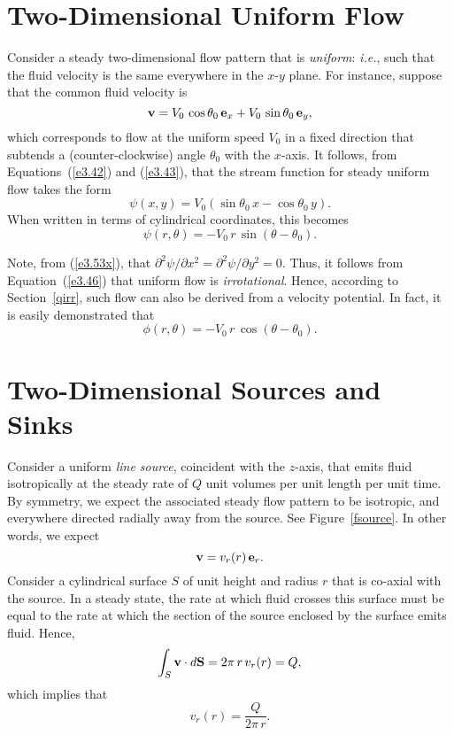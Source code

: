 \section{Two-Dimensional Uniform Flow}\label{suniform}
Consider a steady two-dimensional flow pattern that is {\em uniform}: {\em i.e.}, such that the fluid velocity
is the same everywhere in the $x$-$y$ plane. For instance, suppose that the common fluid velocity is
\begin{equation}
{\bf v} = V_0\,\cos\theta_0\,{\bf e}_x + V_0\,\sin\theta_0\,{\bf e}_y,
\end{equation}
which corresponds to flow at the uniform speed $V_0$ in a fixed direction that subtends a (counter-clockwise) angle
$\theta_0$ with the $x$-axis.  It follows, from Equations~(\ref{e3.42}) and (\ref{e3.43}), that the
stream function for steady uniform flow takes the form
\begin{equation}\label{e3.53x}
\psi(x,y) = V_0\left(\sin\theta_0\,x-\cos\theta_0\,y\right).
\end{equation}
When written in terms of cylindrical coordinates, this becomes
\begin{equation}
\psi(r,\theta)=-V_0\,r\,\sin(\theta-\theta_0).
\end{equation}

Note, from (\ref{e3.53x}), that $\partial^2\psi/\partial x^2=\partial^2\psi/\partial y^2=0$. Thus, it
follows from Equation~(\ref{e3.46}) that uniform flow is {\em irrotational}. Hence, according to
Section~\ref{qirr}, such flow can also be derived from a velocity potential. In fact, it is easily
demonstrated that
\begin{equation}
\phi(r,\theta)  = -V_0\,r\,\cos(\theta-\theta_0).
\end{equation}

\section{Two-Dimensional Sources and Sinks}\label{ssource}
Consider a uniform {\em line source}, coincident with the $z$-axis,
that emits fluid isotropically at the steady rate of $Q$ unit volumes per unit length per unit time. 
By symmetry, we expect the associated steady flow pattern to be isotropic, and everywhere directed radially away from the source.
See Figure~\ref{fsource}. In other words, we expect
\begin{equation}
{\bf v} = v_r(r)\,{\bf e}_r.
\end{equation}
Consider a cylindrical surface $S$ of unit height and radius $r$ that is co-axial with the source. In a steady state,
the rate at which fluid crosses this surface must be equal to the rate at which the
section of the source enclosed by the surface emits fluid. Hence,
\begin{equation}
\int_S {\bf v}\cdot d{\bf S} = 2\pi\,r\,v_r(r)= Q,
\end{equation}
which implies that
\begin{equation}
v_r(r) = \frac{Q}{2\pi\,r}.
\end{equation}

